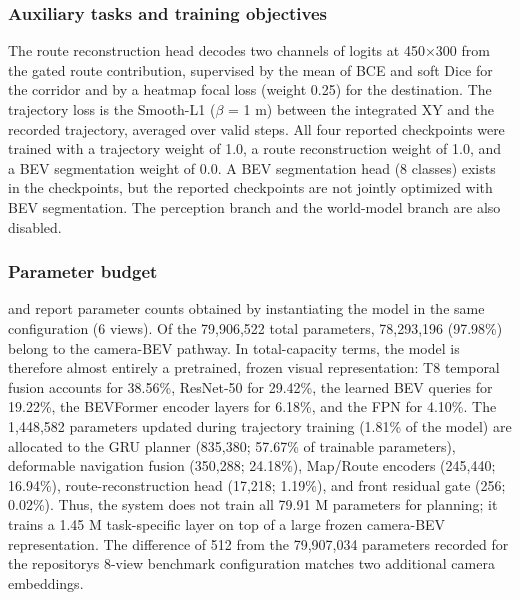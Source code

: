 \documentclass[
  english,
  10pt,
]{article}
\begin{document}
\subsubsection{Auxiliary tasks and training
objectives}\label{auxiliary-tasks-and-training-objectives}

The route reconstruction head decodes two channels of logits at 450×300
from the gated route contribution, supervised by the mean of BCE and
soft Dice for the corridor and by a heatmap focal loss (weight 0.25) for
the destination. The trajectory loss is the Smooth-L1 ($\beta$ = 1 m) between
the integrated XY and the recorded trajectory, averaged over valid
steps. All four reported checkpoints were trained with a trajectory
weight of 1.0, a route reconstruction weight of 1.0, and a BEV
segmentation weight of 0.0. A BEV segmentation head (8 classes) exists
in the checkpoints, but the reported checkpoints are not jointly
optimized with BEV segmentation. The perception branch and the
world-model branch are also disabled.

\subsubsection{Parameter budget}\label{parameter-budget}

\hyperref[tab-params]{}and \hyperref[fig-params]{}report parameter
counts obtained by instantiating the model in the same configuration (6
views). Of the 79,906,522 total parameters, 78,293,196 (97.98\%) belong
to the camera-BEV pathway. In total-capacity terms, the model is
therefore almost entirely a pretrained, frozen visual representation: T8
temporal fusion accounts for 38.56\%, ResNet-50 for 29.42\%, the learned
BEV queries for 19.22\%, the BEVFormer encoder layers for 6.18\%, and
the FPN for 4.10\%. The 1,448,582 parameters updated during trajectory
training (1.81\% of the model) are allocated to the GRU planner
(835,380; 57.67\% of trainable parameters), deformable navigation fusion
(350,288; 24.18\%), Map/Route encoders (245,440; 16.94\%),
route-reconstruction head (17,218; 1.19\%), and front residual gate
(256; 0.02\%). Thus, the system does not train all 79.91 M parameters
for planning; it trains a 1.45 M task-specific layer on top of a large
frozen camera-BEV representation. The difference of 512 from the
79,907,034 parameters recorded for the repository\textquotesingle s
8-view benchmark configuration matches two additional camera embeddings.
\end{document}
